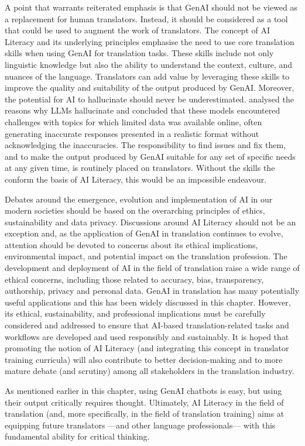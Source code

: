 \documentclass[output=paper]{langscibook}
\begin{document}
A point that warrants reiterated emphasis is that GenAI should not be viewed as a replacement for human translators. Instead, it should be considered as a tool that could be used to augment the work of translators. The concept of AI Literacy and its underlying principles emphasise the need to use core translation skills when using GenAI for translation tasks. These skills include not only linguistic knowledge but also the ability to understand the context, culture, and nuances of the language. Translators can add value by leveraging these skills to improve the quality and suitability of the output produced by GenAI. Moreover, the potential for AI to hallucinate should never be underestimated. \citet{waldoboussard24} analysed the reasons why LLMs hallucinate and concluded that these models encountered challenges with topics for which limited data was available online, often generating inaccurate responses presented in a realistic format without acknowledging the inaccuracies. The responsibility to find issues and fix them, and to make the output produced by GenAI suitable for any set of specific needs at any given time, is routinely placed on translators. Without the skills the conform the basis of AI Literacy, this would be an impossible endeavour.

Debates around the emergence, evolution and implementation of AI in our modern societies should be based on the overarching principles of ethics, sustainability and data privacy. Discussions around AI Literacy should not be an exception and, as the application of GenAI in translation continues to evolve, attention should be devoted to concerns about its ethical implications, environmental impact, and potential impact on the translation profession. The development and deployment of AI in the field of translation raise a wide range of ethical concerns, including those related to accuracy, bias, transparency, authorship, privacy and personal data. GenAI in translation has many potentially useful applications and this has been widely discussed in this chapter. However, its ethical, sustainability, and professional implications must be carefully considered and addressed to ensure that AI-based translation-related tasks and workflows are developed and used responsibly and sustainably. It is hoped that promoting the notion of AI Literacy (and integrating this concept in translator training curricula) will also contribute to better decision-making and to more mature debate (and scrutiny) among all stakeholders in the translation industry.

As mentioned earlier in this chapter, using GenAI chatbots is easy, but using their output critically requires thought. Ultimately, AI Literacy in the field of translation (and, more specifically, in the field of translation training) aims at equipping future translators —and other language professionals— with this fundamental ability for critical thinking.


\sloppy\printbibliography[heading=subbibliography,notkeyword=this]
\end{document}
